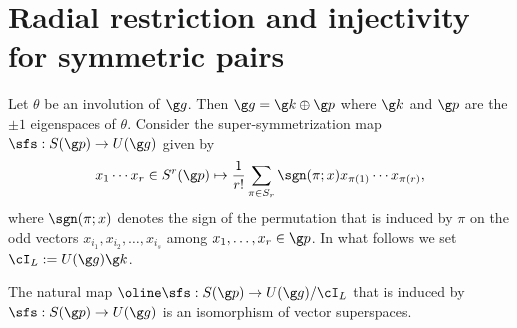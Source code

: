 \documentclass[11pt]{amsart}
\begin{document}
\section{Radial restriction and injectivity for symmetric pairs}
\label{sec:Radialres}
Let $\theta$ be an involution of $\g g$. Then $\g g=\g k\oplus\g p$ where $\g k$ and $\g p$ are the $\pm 1$ eigenspaces of $\theta$.
Consider the super-symmetrization map
$\sfs:S(\g p)\to U(\g g)$ given by
\[
x_1\cdots x_r\in S^r(\g p)\mapsto 
\frac{1}{r!}\sum_{\pi\in S_r}
\sgn(\pi;x)x_{\pi(1)}\cdots x_{\pi(r)},
\] 
where $\sgn(\pi;x)$ denotes the sign of the permutation that is induced by $\pi$ on the odd vectors $x_{i_1},x_{i_2},\dots , x_{i_s}$ among $x_1,\dots , x_r\in\g p$. 
In what follows we set $\cI_L:=U(\g g)\g k$.
\begin{prp}\label{prp:S(p)IL}
	The natural map
	$
	\oline\sfs:S(\g p)\to U(\g g)/\cI_L
	$
	that is induced by  $\sfs:S(\g p)\to U(\g g)$ is an isomorphism of vector superspaces. 
\end{prp}
\end{document}
